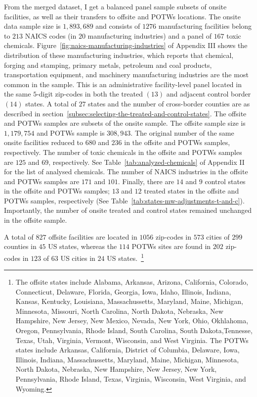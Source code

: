 \documentclass[12pt, english]{article}
\begin{document}
    From the merged dataset, I get a balanced panel sample subsets of onsite facilities, as well as their transfers to offsite and POTWs locations. The onsite data sample size is $1,893,689$ and consists of $1276$ manufacturing facilities belong to $213$ NAICS codes (in $20$ manufacturing industries) and a panel of $167$ toxic chemicals. Figure~\ref{fig:naics-manufacturing-industries} of Appendix III shows the distribution of these manufacturing industries, which reports that chemical, forging and stamping, primary metals, petroleum and coal products, transportation equipment, and machinery manufacturing industries are the most common in the sample. This is an administrative facility-level panel located in the same $5$-digit zip-codes in both the treated $(13)$ and adjacent control border $(14)$ states. A total of $27$ states and the number of cross-border counties are as described in section~\ref{subsec:selecting-the-treated-and-control-states}. The offsite and POTWs samples are subsets of the onsite sample. The offsite sample size is $1,179,754$ and POTWs sample is $308,943$. The original number of the same onsite facilities reduced to $680$ and $236$ in the offsite and POTWs samples, respectively. The number of toxic chemicals in the offsite and POTWs samples are $125$ and $69$, respectively. See Table~\ref{tab:analyzed-chemicals} of Appendix II for the list of analysed chemicals. The number of NAICS industries in the offsite and POTWs samples are $171$ and $101$. Finally, there are $14$ and $9$ control states in the offsite and POTWs samples; $13$ and $12$ treated states in the offsite and POTWs samples, respectively (See Table~\ref{tab:states-mw-adjustments-t-and-c}). Importantly, the number of onsite treated and control states remained unchanged in the offsite sample.

    A total of $827$ offsite facilities are located in $1056$ zip-codes in $573$ cities of $299$ counties in $45$ US states, whereas the $114$ POTWs sites are found in $202$ zip-codes in $123$ of $63$ US cities in $24$ US states.~\footnote{\tiny The offsite states include Alabama, Arkansas, Arizona, California, Colorado, Connecticut, Delaware, Florida, Georgia, Iowa, Idaho, Illinois, Indiana, Kansas, Kentucky, Louisiana, Massachussetts, Maryland, Maine, Michigan, Minnesota, Missouri, North Carolina, North Dakota, Nebraska, New Hampshire, New Jersey, New Mexico, Nevada, New York, Ohio, Okhlahoma, Oregon, Pennsylvania, Rhode Island, South Carolina, South Dakota,Tennesse, Texas, Utah, Virginia, Vermont, Wisconsin, and West Virginia. The POTWs states include Arkansas, California, District of Columbia, Delaware, Iowa, Illinois, Indiana, Massachussetts, Maryland, Maine, Michigan, Minnesota, North Dakota, Nebraska, New Hampshire, New Jersey, New York, Pennsylvania, Rhode Island, Texas, Virginia, Wisconsin, West Virginia, and Wyoming.}
\end{document}
